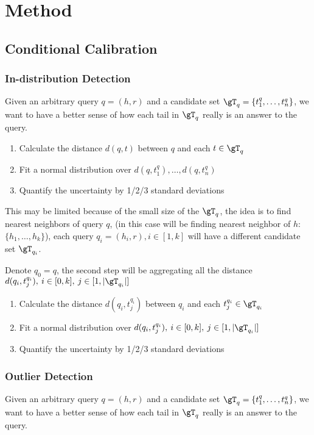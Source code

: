 
\newpage
\section{Method}
\subsection{Conditional Calibration}
\subsubsection{In-distribution Detection}
Given an arbitrary query $q=(h,r)$ and a candidate set $\gT_q = \{t_1^q, \dots, t_n^q\}$, we want to have a better sense of how each tail in $\gT_q$ really is an answer to the query.

\begin{enumerate}[noitemsep,topsep=0pt,parsep=1pt,partopsep=0pt, leftmargin=*]
    \item Calculate the distance $d(q,t)$ between $q$ and each $t \in \gT_q$
    \item Fit a normal distribution over $d(q,t_1^q), \dots, d(q,t_n^q)$
    \item Quantify the uncertainty by 1/2/3 standard deviations
\end{enumerate}

This may be limited because of the small size of the $\gT_q$, the idea is to find nearest neighbors of query $q$, (in this case will be finding nearest neighbor of $h$: $\{h_1,\dots, h_k\}$), each query $q_i=(h_i, r), i\in[1,k]$ will have a different candidate set $\gT_{q_i}$. 

Denote $q_0 = q$, the second step will be aggregating all the distance $d(q_i, t_j^{q_i}),\: i\in[0, k],\: j\in[1, |\gT_{q_i}|]$


\begin{enumerate}[noitemsep,topsep=0pt,parsep=1pt,partopsep=0pt, leftmargin=*]
    \item Calculate the distance $d(q_i,t_j^{q_i})$ between {\color{red} $q_i$ and each $t_j^{q_i} \in \gT_{q_i}$}
    \item Fit a normal distribution over $d(q_i, t_j^{q_i}),\: i\in[0, k],\: j\in[1, |\gT_{q_i}|]$
    \item Quantify the uncertainty by 1/2/3 standard deviations
\end{enumerate}


\subsubsection{Outlier Detection}
Given an arbitrary query $q=(h,r)$ and a candidate set $\gT_q = \{t_1^q, \dots, t_n^q\}$, we want to have a better sense of how each tail in $\gT_q$ really is an answer to the query.


